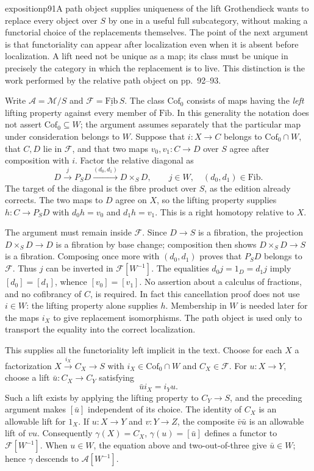 \begin{dcomment}{exposition}{p91}{A path object supplies uniqueness of the lift}
Grothendieck wants to replace every object over $S$ by one in a useful full subcategory, without making a functorial choice of the replacements themselves. The point of the next argument is that functoriality can appear after localization even when it is absent before localization. A lift need not be unique as a map; its class must be unique in precisely the category in which the replacement is to live. This distinction is the work performed by the relative path object on pp.~92--93.

Write $\mathcal A=\mathcal M/S$ and $\mathcal F=\underline{\mathrm{Fib}}\,S$. The class $\mathrm{Cof}_0$ consists of maps having the \emph{left} lifting property against every member of $\mathrm{Fib}$. In this generality the notation does not assert $\mathrm{Cof}_0\subseteq W$; the argument assumes separately that the particular map under consideration belongs to $W$. Suppose that $i:X\to C$ belongs to $\mathrm{Cof}_0\cap W$, that $C,D$ lie in $\mathcal F$, and that two maps $v_0,v_1:C\to D$ over $S$ agree after composition with $i$. Factor the relative diagonal as
\[
D\xrightarrow{j}P_SD\xrightarrow{(d_0,d_1)}D\times_S D,
\qquad j\in W,\quad (d_0,d_1)\in\mathrm{Fib}.
\]
The target of the diagonal is the fibre product over $S$, as the edition already corrects. The two maps to $D$ agree on $X$, so the lifting property supplies $h:C\to P_SD$ with $d_0h=v_0$ and $d_1h=v_1$. This is a right homotopy relative to $X$.

The argument must remain inside $\mathcal F$. Since $D\to S$ is a fibration, the projection $D\times_S D\to D$ is a fibration by base change; composition then shows $D\times_S D\to S$ is a fibration. Composing once more with $(d_0,d_1)$ proves that $P_SD$ belongs to $\mathcal F$. Thus $j$ can be inverted in $\mathcal F[W^{-1}]$. The equalities $d_0j=1_D=d_1j$ imply $[d_0]=[d_1]$, whence $[v_0]=[v_1]$. No assertion about a calculus of fractions, and no cofibrancy of $C$, is required. In fact this cancellation proof does not use $i\in W$: the lifting property alone supplies $h$. Membership in $W$ is needed later for the maps $i_X$ to give replacement isomorphisms. The path object is used only to transport the equality into the correct localization.

This supplies all the functoriality left implicit in the text. Choose for each $X$ a factorization $X\xrightarrow{i_X}C_X\to S$ with $i_X\in\mathrm{Cof}_0\cap W$ and $C_X\in\mathcal F$. For $u:X\to Y$, choose a lift $\bar u:C_X\to C_Y$ satisfying
\[
\bar u i_X=i_Yu.
\]
Such a lift exists by applying the lifting property to $C_Y\to S$, and the preceding argument makes $[\bar u]$ independent of its choice. The identity of $C_X$ is an allowable lift for $1_X$. If $u:X\to Y$ and $v:Y\to Z$, the composite $\bar v\bar u$ is an allowable lift of $vu$. Consequently $\gamma(X)=C_X$, $\gamma(u)=[\bar u]$ defines a functor to $\mathcal F[W^{-1}]$. When $u\in W$, the equation above and two-out-of-three give $\bar u\in W$; hence $\gamma$ descends to $\mathcal A[W^{-1}]$.


\end{dcomment}
